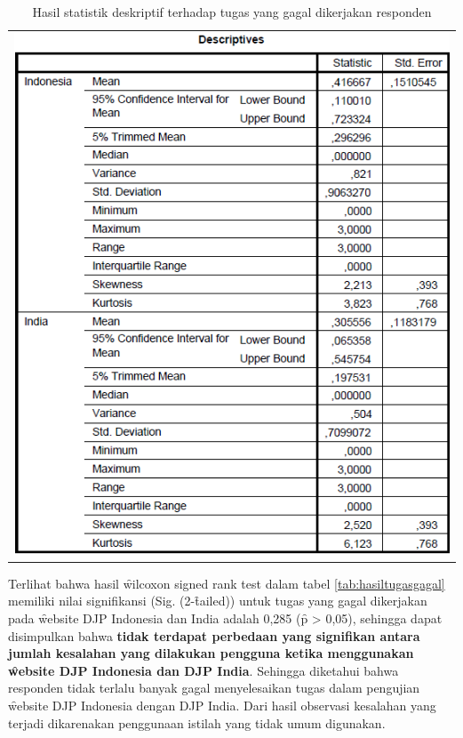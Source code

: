 \begin{table}
\centering
\caption{Hasil statistik deskriptif terhadap tugas yang gagal dikerjakan responden}
\label{tab:tugasgagaldesc}
\begin{tabular}{c}
	\includegraphics[width=\textwidth]
	{pics/tugasgagaldesc.PNG}
\end{tabular}
\end{table}
\noindent
Terlihat bahwa hasil \f{wilcoxon signed rank test} dalam tabel \ref{tab:hasiltugasgagal} memiliki nilai signifikansi (Sig. (2-\f{tailed})) untuk tugas yang gagal dikerjakan pada \f{website} DJP Indonesia dan India adalah 0,285 (\f{p} > 0,05), sehingga dapat disimpulkan bahwa \textbf{tidak terdapat perbedaan yang signifikan antara jumlah kesalahan yang dilakukan pengguna ketika menggunakan \f{website} DJP Indonesia dan DJP India}. Sehingga diketahui bahwa responden tidak terlalu banyak gagal menyelesaikan tugas dalam pengujian \f{website} DJP Indonesia dengan DJP India. Dari hasil observasi kesalahan yang terjadi dikarenakan penggunaan istilah yang tidak umum digunakan.
